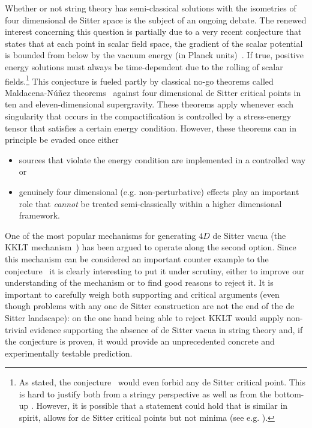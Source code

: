 \documentclass[aps,prd,amsmath,amsfonts,a4paper,11pt,reprint,twocolumn,square,numbers,showpacs,superscriptaddress,floatfix,sort&compress,nofootinbib]{revtex4-1}
\begin{document}
Whether or not string theory has semi-classical solutions with the isometries of four dimensional de Sitter space is the subject of an ongoing debate. The renewed interest concerning this question is partially due to a very recent conjecture that states that at each point in scalar field space,
the gradient of the scalar potential is bounded from below by the vacuum energy (in Planck units)~\cite{Obied:2018sgi}. If true, positive energy solutions must always be time-dependent due to the rolling of scalar fields.\footnote{As stated, the conjecture~\cite{Obied:2018sgi} would even forbid any de Sitter critical point. This is hard to justify both from a stringy perspective \cite{Roupec:2018mbn,Conlon:2018eyr} as well as from the bottom-up \cite{Denef:2018etk,Murayama:2018lie,Choi:2018rze}. However, it is possible that a statement could hold that is similar in spirit, allows for de Sitter critical points but not minima (see e.g. \cite{Garg:2018reu,Conlon:2018eyr}).}  This conjecture is fueled partly by classical no-go theorems called Maldacena-N\'{u}\~{n}ez theorems~\cite{deWit:1986mwo,Maldacena:2000mw} against four dimensional de Sitter critical points in ten and eleven-dimensional supergravity. These theorems apply whenever each singularity that occurs in the compactification is controlled by a stress-energy tensor that satisfies a certain energy condition. However, these theorems can in principle be evaded once either 
\begin{itemize}
	\item sources that violate the energy condition are implemented in a controlled way or
	\item  genuinely four dimensional (e.g. non-perturbative) effects play an important role that \textit{cannot} be treated semi-classically within a higher dimensional framework.
\end{itemize}
One of the most popular mechanisms for generating $4D$ de Sitter vacua (the KKLT mechanism~\cite{Kachru:2003aw}) has been argued to operate along the second option. Since this mechanism can be considered an important counter example to the conjecture~\cite{Obied:2018sgi} it is clearly interesting to put it under scrutiny, either to improve our understanding of the mechanism or to find good reasons to reject it. It is important to carefully weigh both supporting and critical arguments (even though problems with any one de Sitter construction are not the end of the de Sitter landscape): 
on the one hand being able to reject KKLT would supply non-trivial evidence supporting the absence of de Sitter vacua in string theory and, if the conjecture is proven, it would provide an unprecedented concrete and experimentally testable prediction.
\end{document}
